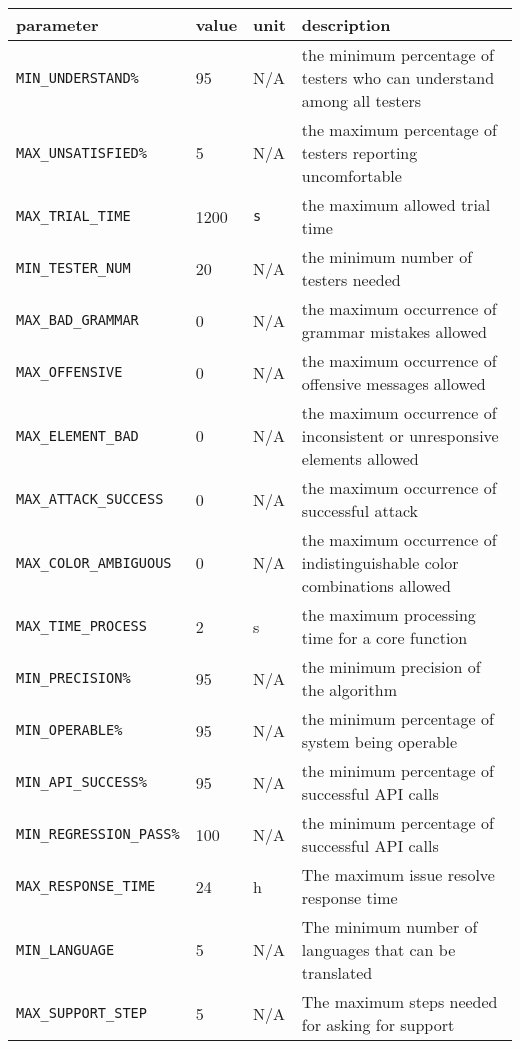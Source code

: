 \documentclass[12pt, titlepage]{article}
\begin{document}
\begin{tabular}{|l|l|l|p{5cm}|}

\hline
parameter & value & unit & description\\
\hline
\texttt{MIN\_UNDERSTAND\%} & 95 & N/A & the minimum percentage of testers who can understand among all testers\\
\hline
\texttt{MAX\_UNSATISFIED\%} & 5 & N/A & the maximum percentage of testers reporting uncomfortable\\
\hline
\texttt{MAX\_TRIAL\_TIME} & 1200 & \texttt{s} & the maximum allowed trial time\\
\hline
\texttt{MIN\_TESTER\_NUM} &  20& N/A & the minimum number of testers needed\\
\hline
\texttt{MAX\_BAD\_GRAMMAR} & 0& N/A & the maximum occurrence of grammar mistakes allowed \\
\hline
\texttt{MAX\_OFFENSIVE} & 0& N/A & the maximum occurrence of offensive messages allowed\\
\hline
\texttt{MAX\_ELEMENT\_BAD} & 0& N/A & the maximum occurrence of inconsistent 
 or unresponsive elements allowed\\
\hline
\texttt{MAX\_ATTACK\_SUCCESS} & 0& N/A & the maximum occurrence of successful attack\\
\hline
\texttt{MAX\_COLOR\_AMBIGUOUS} & 0& N/A & the maximum occurrence of indistinguishable color combinations allowed\\
\hline
\texttt{MAX\_TIME\_PROCESS} & 2& s & the maximum processing time for a core function\\
\hline
\texttt{MIN\_PRECISION\%} & 95 & N/A & the minimum precision of the algorithm\\
\hline
\texttt{MIN\_OPERABLE\%} & 95 & N/A & the minimum percentage of system being operable \\
\hline
\texttt{MIN\_API\_SUCCESS\%} & 95 & N/A &  the minimum percentage of successful API calls\\
\hline
\texttt{MIN\_REGRESSION\_PASS\%} & 100  & N/A &  the minimum percentage of successful API calls\\
\hline
\texttt{MAX\_RESPONSE\_TIME} & 24 & h & The maximum issue resolve response time\\
\hline
\texttt{MIN\_LANGUAGE}& 5& N/A & The minimum number of languages that can be translated\\
\hline
\texttt{MAX\_SUPPORT\_STEP} & 5&N/A& The maximum steps needed for asking for support\\

\hline
\end{tabular}
\end{document}
